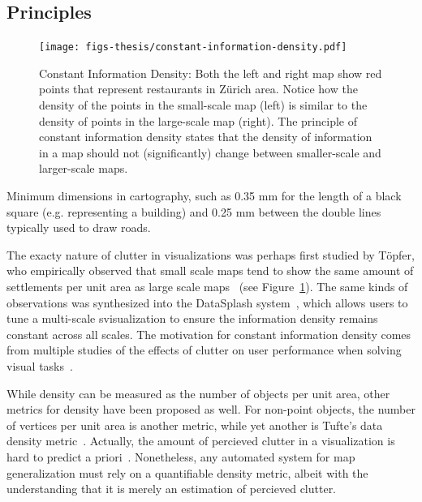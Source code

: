\documentclass[11pt, oneside]{report}
\begin{document}
\subsection{Principles}

\begin{figure}[htbp]
\begin{center}
\texttt{[image: figs-thesis/constant-information-density.pdf]}
\caption{Constant Information Density: Both the left and right map show red points that represent restaurants in Z{\"u}rich area. Notice how the density of the points in the small-scale map (left) is similar to the density of points in the large-scale map (right). The principle of constant information density states that the density of information in a map should not (significantly) change between smaller-scale and larger-scale maps.}
\label{fig:state:of:the:art:constant:information:density}
\end{center}
\vspace*{-4ex}
\end{figure}

Minimum dimensions in cartography, such as 0.35 mm for the length of a black square (e.g. representing a building) and 0.25 mm between the double lines typically used to draw roads.

The exacty nature of clutter in visualizations was perhaps first studied by T{\"o}pfer, who empirically observed that small scale maps tend to show the same amount of settlements per unit area as large scale maps~\cite{topfer1966principles} (see Figure~\ref{fig:state:of:the:art:constant:information:density}). The same kinds of observations was synthesized into the DataSplash system~\cite{woodruff1998constant}, which allows users to tune a multi-scale svisualization to ensure the information density remains constant across all scales. The motivation for constant information density comes from multiple studies of the effects of clutter on user performance when solving visual tasks~\cite{phillips1982investigation, springer1987retrieval, tullis1988screen}. 

While density can be measured as the number of objects per unit area, other metrics for density have been proposed as well. For non-point objects, the number of vertices per unit area is another metric, while yet another is Tufte's data density metric~\cite{tufte1983visual}. Actually, the amount of percieved clutter in a visualization is hard to predict a priori~\cite{phillips1982investigation}. Nonetheless, any automated system for map generalization must rely on a quantifiable density metric, albeit with the understanding that it is merely an estimation of percieved clutter.
\end{document}
